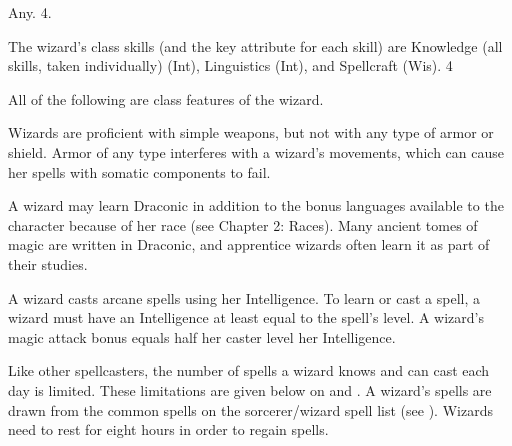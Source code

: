  Any.
 4.

The wizard's class skills (and the key attribute for each skill) are
Knowledge (all skills, taken individually) (Int), Linguistics (Int), and Spellcraft (Wis).
 4


All of the following are class features of the wizard.

 Wizards are proficient with simple weapons, but not with any type of armor or shield. Armor of any type interferes with a wizard's movements, which can cause her spells with somatic components to fail.

 A wizard may learn Draconic in addition to the bonus languages available to the character because of her race (see Chapter 2: Races). Many ancient tomes of magic are written in Draconic, and apprentice wizards often learn it as part of their studies.

 A wizard casts arcane spells using her Intelligence. To learn or cast a spell, a wizard must have an Intelligence at least equal to the spell's level. A wizard's magic attack bonus equals half her caster level \add her Intelligence.

Like other spellcasters, the number of spells a wizard knows and can cast each day is limited. These limitations are given below on  and . A wizard's spells are drawn from the common spells on the sorcerer/wizard spell list (see ). Wizards need to rest for eight hours in order to regain spells. 

